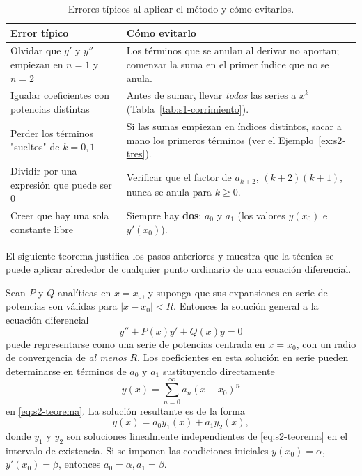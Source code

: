 \begin{table}[H]
\centering
\small
\caption{Errores típicos al aplicar el método y cómo evitarlos.}
\label{tab:s2-errores}
\begin{tabular}{|p{5.6cm}|p{9.2cm}|}
\hline
\rowcolor{bbe!15}\textbf{Error típico} & \textbf{Cómo evitarlo} \\ \hline
Olvidar que $y'$ y $y''$ empiezan en $n=1$ y $n=2$ & Los términos que se anulan al derivar no aportan; comenzar la suma en el primer índice que no se anula. \\ \hline
Igualar coeficientes con potencias distintas & Antes de sumar, llevar \emph{todas} las series a $x^k$ (Tabla~\ref{tab:s1-corrimiento}). \\ \hline
Perder los términos "sueltos" de $k=0,1$ & Si las sumas empiezan en índices distintos, sacar a mano los primeros términos (ver el Ejemplo~\ref{ex:s2-tres}). \\ \hline
Dividir por una expresión que puede ser $0$ & Verificar que el factor de $a_{k+2}$, $(k+2)(k+1)$, nunca se anula para $k\ge 0$. \\ \hline
Creer que hay una sola constante libre & Siempre hay \textbf{dos}: $a_0$ y $a_1$ (los valores $y(x_0)$ e $y'(x_0)$). \\ \hline
\end{tabular}
\end{table}
 
El siguiente teorema justifica los pasos anteriores y muestra que la técnica se puede aplicar alrededor de cualquier punto ordinario de una ecuación diferencial.
 
\begin{theorem}\label{thm:s2-ordinario}
    Sean $P$ y $Q$ analíticas en $x = x_0$, y suponga que sus expansiones en serie de potencias son válidas para $|x - x_0| < R$. Entonces la solución general a la ecuación diferencial
\begin{equation}
y'' + P(x)y' + Q(x)y = 0
\label{eq:s2-teorema}
\end{equation}
puede representarse como una serie de potencias centrada en $x = x_0$, con un radio de convergencia de \textit{al menos} $R$. Los coeficientes en esta solución en serie pueden determinarse en términos de $a_0$ y $a_1$ sustituyendo directamente
\[ y(x) = \sum_{n=0}^{\infty} a_n(x - x_0)^n \]
en \eqref{eq:s2-teorema}. La solución resultante es de la forma
\[ y(x) = a_0 y_1(x) + a_1 y_2(x), \]
donde $y_1$ y $y_2$ son soluciones linealmente independientes de \eqref{eq:s2-teorema} en el intervalo de existencia. Si se imponen las condiciones iniciales $y(x_0) = \alpha$, $y'(x_0) = \beta$, entonces $a_0 = \alpha, a_1 = \beta$.
\end{theorem}
 
